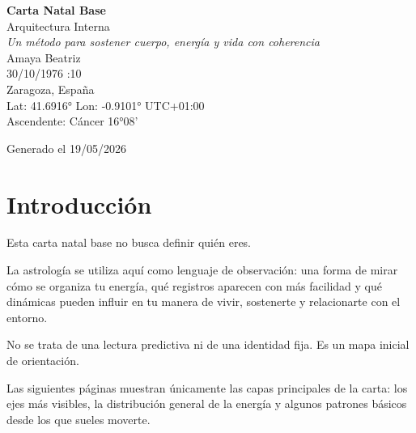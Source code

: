 \documentclass[11pt,a4paper]{article}
\begin{document}

\begin{titlepage}

\centering

\vspace*{1.5cm}

{\Huge\bfseries\color{azulai} Carta Natal Base}\\[0.5cm]

{\large\color{grisai} Arquitectura Interna}\\[0.4cm]

{\small\itshape\color{grisai}
Un método para sostener cuerpo, energía y vida con coherencia
}\\[2cm]

{\huge\color{doradoai} Amaya Beatriz}\\[1.5cm]

{\Large 30/10/1976 :10}\\[0.3cm]

{\Large Zaragoza, España}\\[0.3cm]

{\normalsize
Lat: 41.6916° \quad
Lon: -0.9101° \quad
UTC+01:00
}\\[0.5cm]

{\normalsize
Ascendente: Cáncer 16°08'
}\\[2.5cm]

\vfill

{\small Generado el 19/05/2026}

\end{titlepage}



\section*{Introducción}

Esta carta natal base no busca definir quién eres.

La astrología se utiliza aquí como lenguaje de observación:
una forma de mirar cómo se organiza tu energía,
qué registros aparecen con más facilidad
y qué dinámicas pueden influir en tu manera de vivir, sostenerte y relacionarte con el entorno.

No se trata de una lectura predictiva ni de una identidad fija.
Es un mapa inicial de orientación.

Las siguientes páginas muestran únicamente las capas principales de la carta:
los ejes más visibles,
la distribución general de la energía
y algunos patrones básicos desde los que sueles moverte.
\end{document}

